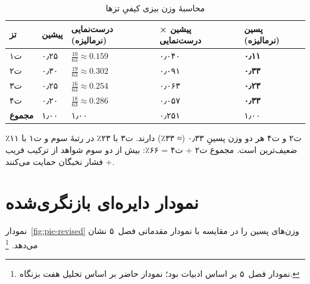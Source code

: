 \documentclass[12pt,a4paper]{book}
\begin{document}
\begin{table}[ht]
\centering
\caption{محاسبهٔ وزن بیزی کیفیِ تزها}
\label{tab:bayesian-calc}
\begin{tabular}{>{\centering\arraybackslash}m{3cm}
                >{\centering\arraybackslash}m{1.8cm}
                >{\centering\arraybackslash}m{2.2cm}
                >{\centering\arraybackslash}m{2.2cm}
                >{\centering\arraybackslash}m{2.2cm}}
\toprule
\textbf{تز}
  & \textbf{پیشین}
  & \textbf{درست‌نمایی (نرمالیزه)}
  & \textbf{پیشین × درست‌نمایی}
  & \textbf{پسین (نرمالیزه)} \\
\midrule
\cellcolor{cGreen!12} ت‌۱
  & ۰٫۲۵
  & $\frac{10}{63} \approx 0.159$
  & ۰٫۰۴۰
  & \textbf{۰٫۱۱} \\
\addlinespace
\cellcolor{cAccent!12} ت‌۲
  & ۰٫۳۰
  & $\frac{19}{63} \approx 0.302$
  & ۰٫۰۹۱
  & \textbf{۰٫۳۳} \vphantom{\Big|}\\
\addlinespace
\cellcolor{cGold!12} ت‌۳
  & ۰٫۲۵
  & $\frac{16}{63} \approx 0.254$
  & ۰٫۰۶۳
  & \textbf{۰٫۲۳} \\
\addlinespace
\cellcolor{cConsolid!12} ت‌۴
  & ۰٫۲۰
  & $\frac{18}{63} \approx 0.286$
  & ۰٫۰۵۷
  & \textbf{۰٫۳۳} \vphantom{\Big|}\\
\midrule
\textbf{مجموع}
  & ۱٫۰۰
  & ۱٫۰۰
  & ۰٫۲۵۱ \vphantom{\Big|}
  & ۱٫۰۰ \\
\bottomrule
\end{tabular}
\end{table}

\begin{noteBox}[تفسیر]
ت‌۲ و ت‌۴ هر دو وزن پسینِ ۰٫۳۳ (≈ ۳۳٪) دارند.
ت‌۳ با ۲۳٪ در رتبهٔ سوم و ت‌۱ با ۱۱٪ ضعیف‌ترین است.
مجموع ت‌۲ + ت‌۴ = ۶۶٪:
بیش از دو سوم شواهد از ترکیب فریب + فشار نخبگان حمایت می‌کنند.
\end{noteBox}

\section{نمودار دایره‌ای بازنگری‌شده}
\label{sec:ch15-pie}

نمودار~\ref{fig:pie-revised} وزن‌های پسین را
در مقایسه با نمودار مقدماتی فصل~۵ نشان می‌دهد.%
\footnote{نمودار فصل~۵ بر اساس ادبیات بود؛
نمودار حاضر بر اساس تحلیل هفت بزنگاه.}
\end{document}
